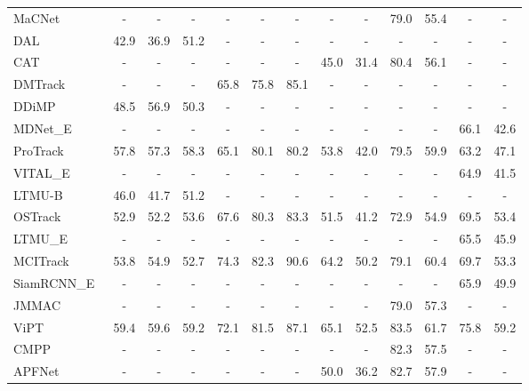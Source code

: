 \begin{table}[t]
\begin{tabular}{l|ccc|ccc|cc|cc|cc}
MaCNet~\cite{macnet}
&  -   &  -   &  -   &  -   &  -   &  -   &  -   &  -   & 79.0 & 55.4 &  -   &  -   \\
DAL~\cite{dal}
& 42.9 & 36.9 & 51.2 &  -   &  -   &  -   &  -   &  -   &  -   &  -   &  -   &  -   \\
CAT~\cite{cat}
&  -   &  -   &  -   &  -   &  -   &  -   & 45.0 & 31.4 & 80.4 & 56.1 &  -   &  -   \\
DMTrack~\cite{vot2022}
&  -   &  -   &  -   & 65.8 & 75.8 & 85.1 &  -   &  -   &  -   &  -   &  -   &  -   \\
DDiMP~\cite{vot2020}
& 48.5 & 56.9 & 50.3 &  -   &  -   &  -   &  -   &  -   &  -   &  -   &  -   &  -   \\
MDNet\_E~\cite{MDNet}
&  -   &  -   &  -   &  -   &  -   &  -   &  -   &  -   &  -   &  -   & 66.1 & 42.6\\
ProTrack~\cite{protrack} 
& 57.8 & 57.3 & 58.3 & 65.1 & 80.1 & 80.2 & 53.8 & 42.0 & 79.5 & 59.9 & 63.2 & 47.1\\
VITAL\_E~\cite{VITAL}
&  -   &  -   &  -   &  -   &  -   &  -   &  -   &  -   &  -   &  -   & 64.9 & 41.5\\
LTMU-B~\cite{LTMU}
& 46.0 & 41.7 & 51.2 &  -   &  -   &  -   &  -   &  -   &  -   &  -   &  -   &  -   \\
OSTrack~\cite{ostrack}
& 52.9 & 52.2 & 53.6 & 67.6 & 80.3 & 83.3 & 51.5 & 41.2 & 72.9 & 54.9 & 69.5 & 53.4 \\
LTMU\_E~\cite{LTMU}
&  -   &  -   &  -   &  -   &  -   &  -   &  -   &  -   &  -   &  -   & 65.5 & 45.9\\
MCITrack~\cite{mcitrack} 
& 53.8 & 54.9 & 52.7 & 74.3 & 82.3 & 90.6 & 64.2 & 50.2 & 79.1 & 60.4 & 69.7 & 53.3\\
SiamRCNN\_E~\cite{SiamRCNN}
&  -   &  -   &  -   &  -   &  -   &  -   &  -   &  -   &  -   &  -   & 65.9 & 49.9\\
JMMAC~\cite{jmmac}
&  -   &  -   &  -   &  -   &  -   &  -   &  -   &  -   & 79.0 & 57.3 &  -   &  -   \\

ViPT~\cite{vipt} 
& 59.4 & 59.6 & 59.2 & 72.1 & 81.5 & 87.1 & 65.1 & 52.5 & 83.5 & 61.7 & 75.8 & 59.2\\
CMPP~\cite{cmpp}
&  -   &  -   &  -   &  -   &  -   &  -   &  -   &  -   & 82.3 & 57.5 &  -   &  -   \\
APFNet~\cite{apfnet}
&  -   &  -   &  -   &  -   &  -   &  -   & 50.0 & 36.2 & 82.7 & 57.9 &  -   &  -   \\



\end{tabular}
\end{table}
